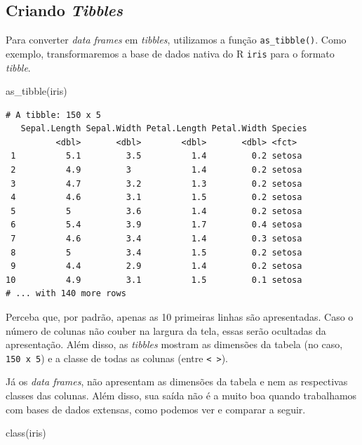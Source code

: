\documentclass[
  brazilian,
]{book}
\newenvironment{Shaded}{\begin{snugshade}}{\end{snugshade}}
\newcommand{\FunctionTok}[1]{\textcolor[rgb]{0.00,0.00,0.00}{#1}}
\newcommand{\NormalTok}[1]{#1}
\begin{document}
\hypertarget{criando-tibbles}{%
\subsection{\texorpdfstring{Criando \emph{Tibbles}}{Criando Tibbles}}\label{criando-tibbles}}

Para converter \emph{data frames} em \emph{tibbles}, utilizamos a função \texttt{as\_tibble()}. Como exemplo, transformaremos a base de dados nativa do R \texttt{iris} para o formato \emph{tibble}.

\begin{Shaded}
\begin{Highlighting}[]
\FunctionTok{as\_tibble}\NormalTok{(iris)}
\end{Highlighting}
\end{Shaded}

\begin{verbatim}
# A tibble: 150 x 5
   Sepal.Length Sepal.Width Petal.Length Petal.Width Species
          <dbl>       <dbl>        <dbl>       <dbl> <fct>  
 1          5.1         3.5          1.4         0.2 setosa 
 2          4.9         3            1.4         0.2 setosa 
 3          4.7         3.2          1.3         0.2 setosa 
 4          4.6         3.1          1.5         0.2 setosa 
 5          5           3.6          1.4         0.2 setosa 
 6          5.4         3.9          1.7         0.4 setosa 
 7          4.6         3.4          1.4         0.3 setosa 
 8          5           3.4          1.5         0.2 setosa 
 9          4.4         2.9          1.4         0.2 setosa 
10          4.9         3.1          1.5         0.1 setosa 
# ... with 140 more rows
\end{verbatim}

Perceba que, por padrão, apenas as 10 primeiras linhas são apresentadas. Caso o número de colunas não couber na largura da tela, essas serão ocultadas da apresentação. Além disso, as \emph{tibbles} mostram as dimensões da tabela (no caso, \texttt{150\ x\ 5}) e a classe de todas as colunas (entre \texttt{\textless{}\ \textgreater{}}).

Já os \emph{data frames}, não apresentam as dimensões da tabela e nem as respectivas classes das colunas. Além disso, sua saída não é a muito boa quando trabalhamos com bases de dados extensas, como podemos ver e comparar a seguir.

\begin{Shaded}
\begin{Highlighting}[]
\FunctionTok{class}\NormalTok{(iris)}
\end{Highlighting}
\end{Shaded}
\end{document}
